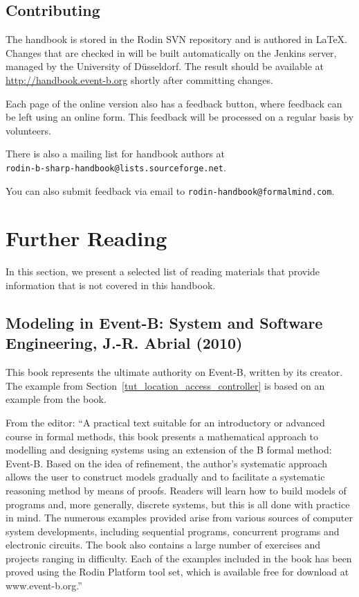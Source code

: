 \documentclass[twoside,10pt]{book}
\begin{document}
\subsection{Contributing}
\label{feedback}

The handbook is stored in the Rodin SVN repository and is authored in \LaTeX.  Changes that are checked in will be built automatically on the Jenkins server, managed by the University of Düsseldorf.  The result should be available at \url{http://handbook.event-b.org} shortly after committing changes.

Each page of the online version also has a feedback button, where feedback can be left using an online form.  This feedback will be processed on a regular basis by volunteers.

There is also a mailing list for handbook authors at 
\ifinprint \\ \fi
\texttt{rodin-b-sharp-handbook@lists.\-sourceforge.net}.

You can also submit feedback via email to \texttt{rodin-hand\-book@formal\-mind.com}.

\section{Further Reading}
\label{literature}

In this section, we present a selected list of reading materials that provide information that is not covered in this handbook.

\subsection{Modeling in Event-B: System and Software Engineering, J.-R. Abrial (2010)}
\label{abrial_2010}

This book represents the ultimate authority on Event-B, written by its creator.  The example from Section~\ref{tut_location_access_controller} is based on an example from the book.

From the editor: ``A practical text suitable for an introductory or advanced course in formal methods, this book presents a mathematical approach to modelling and designing systems using an extension of the B formal method: Event-B. Based on the idea of refinement, the author's systematic approach allows the user to construct models gradually and to facilitate a systematic reasoning method by means of proofs. Readers will learn how to build models of programs and, more generally, discrete systems, but this is all done with practice in mind. The numerous examples provided arise from various sources of computer system developments, including sequential programs, concurrent programs and electronic circuits. The book also contains a large number of exercises and projects ranging in difficulty. Each of the examples included in the book has been proved using the Rodin Platform tool set, which is available free for download at www.event-b.org.''
\end{document}
